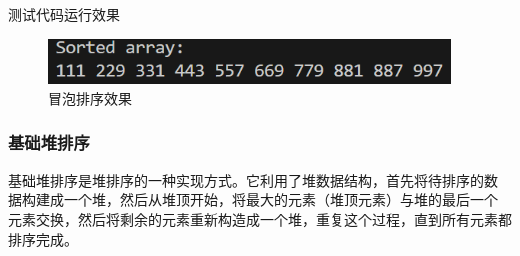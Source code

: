 \documentclass[UTF8]{ctexart}
\begin{document}
测试代码运行效果
\begin{figure}[H]
    \centering
    \includegraphics[width=0.95\textwidth]{picture/Screenshot 2024-10-20 155754.png}
    \caption{冒泡排序效果}
\end{figure}

\subsubsection{基础堆排序}
基础堆排序是堆排序的一种实现方式。它利用了堆数据结构，首先将待排序的数
据构建成一个堆，然后从堆顶开始，将最大的元素（堆顶元素）与堆的最后一个
元素交换，然后将剩余的元素重新构造成一个堆，重复这个过程，直到所有元素都
排序完成。
\end{document}
